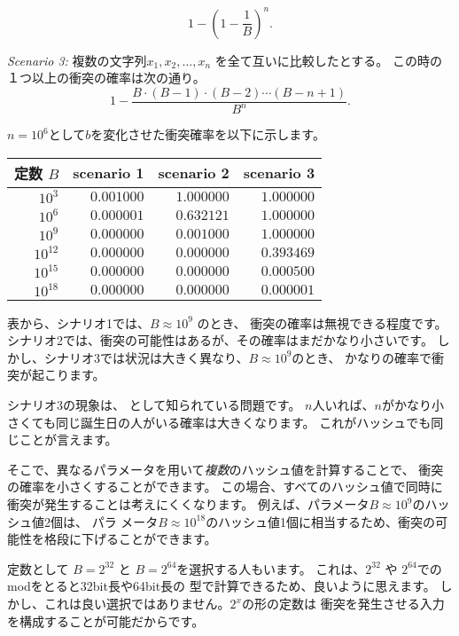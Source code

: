 \[1-(1-\frac{1}{B})^n.\]

\textit{Scenario 3:} 複数の文字列$x_1,x_2,\ldots,x_n$
を全て互いに比較したとする。
この時の１つ以上の衝突の確率は次の通り。
\[ 1 - \frac{B \cdot (B-1) \cdot (B-2) \cdots (B-n+1)}{B^n}.\]

$n=10^6$として$b$を変化させた衝突確率を以下に示します。

\begin{center}
\begin{tabular}{rrrr}
定数 $B$ & scenario 1 & scenario 2 & scenario 3 \\
\hline
$10^3$ & $0.001000$ & $1.000000$ & $1.000000$ \\
$10^6$ & $0.000001$ & $0.632121$ & $1.000000$ \\
$10^9$ & $0.000000$ & $0.001000$ & $1.000000$ \\
$10^{12}$ & $0.000000$ & $0.000000$ & $0.393469$ \\
$10^{15}$ & $0.000000$ & $0.000000$ & $0.000500$ \\
$10^{18}$ & $0.000000$ & $0.000000$ & $0.000001$ \\
\end{tabular}
\end{center}

表から、シナリオ1では、$B \approx 10^9$ のとき、
衝突の確率は無視できる程度です。
シナリオ2では、衝突の可能性はあるが、その確率はまだかなり小さいです。
しかし、シナリオ3では状況は大きく異なり、$B \approx 10^9$のとき、
かなりの確率で衝突が起こります。


シナリオ3の現象は、
として知られている問題です。
$n$人いれば、$n$がかなり小さくても同じ誕生日の人がいる確率は大きくなります。
これがハッシュでも同じことが言えます。

そこで、異なるパラメータを用いて\emph{複数}のハッシュ値を計算することで、
衝突の確率を小さくすることができます。
この場合、すべてのハッシュ値で同時に衝突が発生することは考えにくくなります。
例えば、パラメータ$B \approx 10^9$のハッシュ値2個は、
パラ メータ$B \approx 10^18$のハッシュ値1個に相当するため、衝突の可能性を格段に下げることができます。

定数として $B=2^{32}$ と $B=2^{64}$を選択する人もいます。
これは、$2^{32}$ や $2^{64}$でのmodをとると32bit長や64bit長の
型で計算できるため、良いように思えます。
しかし、これは良い選択ではありません。$2^x$の形の定数は
衝突を発生させる入力を構成することが可能だからです\cite{pac13}。

